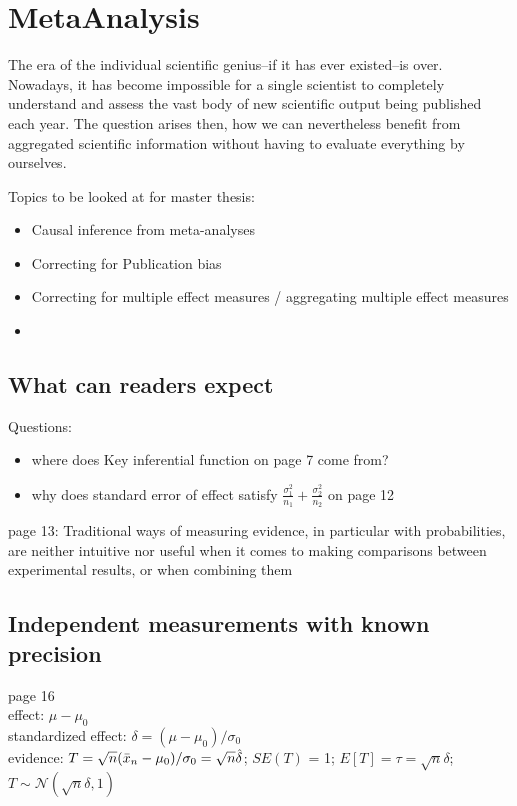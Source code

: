 

    \chapter{MetaAnalysis}

The era of the individual scientific genius--if it has ever existed--is over. Nowadays, it has become impossible for a single scientist to completely understand and assess the vast body of new scientific output being published each year. The question arises then, how we can nevertheless benefit from aggregated scientific information without having to evaluate everything by ourselves. 

Topics to be looked at for master thesis:
\begin{itemize}
    \item Causal inference from meta-analyses
    \item Correcting for Publication bias
    \item Correcting for multiple effect measures / aggregating multiple effect measures
    \item 
\end{itemize}

\section{What can readers expect}

Questions: 
\begin{itemize}
    \item where does Key inferential function on page 7 come from?
    \item why does standard error of effect satisfy $\frac{\sigma_1^2}{n_1}+\frac{\sigma_2^2}{n_2}$ on page 12
\end{itemize}

page 13: Traditional ways of measuring evidence, in particular with probabilities, are neither intuitive nor useful when it comes to making comparisons between experimental results, or when combining them

\section{Independent measurements with known precision}

page 16\\
effect: $\mu - \mu_0$\\
standardized effect: $\delta = (\mu-\mu_0)/\sigma_0$\\
evidence: $T = \sqrt{n}(\Bar{x}_n-\mu_0)/\sigma_0=\sqrt{n}\hat{\delta}$; $SE(T)$ = 1; $E[T]=\tau = \sqrt{n}\delta$; $T \sim \mathcal{N}(\sqrt{n}\delta,1)$\\

